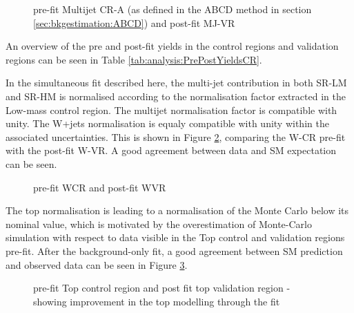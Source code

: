 \begin{figure}[htpb!]
\caption{pre-fit Multijet CR-A (as defined in the ABCD method in section \ref{sec:bkgestimation:ABCD}) and post-fit MJ-VR \label{fig:results:mjcrvr}}
\end{figure}

An overview of the pre and post-fit yields in the control regions and validation regions can be seen in Table \ref{tab:analysis:PrePostYieldsCR}.


In the simultaneous fit described here, the multi-jet contribution in both SR-LM and SR-HM is normalised according to the normalisation factor extracted in the  Low-mass control region.  The multijet normalisation factor is compatible with unity. 
The W+jets normalisation is equaly compatible with unity within the associated uncertainties.  This is shown in Figure \ref{fig:results:wcrvr}, comparing the W-CR pre-fit with the post-fit W-VR.  A good agreement between data and \ac{SM} expectation can be seen.

\begin{figure}[htpb!]
\caption{ pre-fit WCR and post-fit WVR \label{fig:results:wcrvr}}
\end{figure}

The top normalisation is leading to a normalisation of the Monte Carlo below its nominal value,  which is motivated by the overestimation of Monte-Carlo simulation with respect to data visible in the Top control and validation regions pre-fit.  After the background-only fit,  a good agreement between \ac{SM} prediction and observed data can be seen in Figure \ref{fig:results:tcrvr}.

\begin{figure}[htpb!]
\caption{pre-fit Top control region and post fit top validation region -  showing improvement in the top modelling through the fit \label{fig:results:tcrvr} \cite{AnalysisConf}}
\end{figure}

